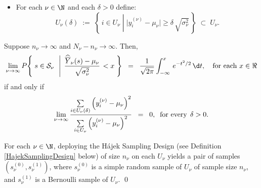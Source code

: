 \begin{theorem}
\begin{itemize}
\begin{equation*}
\end{equation*}
\item For each $\nu \in \N$ and each $\delta > 0$ define:
\begin{equation*}
U_{\nu}(\delta) \;:=\; \left\{\,i \in U_{\nu}\;\left\vert\; \vert y^{(\nu)}_{i} - \mu_{\nu} \vert \geq \delta \, \sqrt{\sigma_{\nu}^{2}} \right.\,\right\}
\; \subset \; U_{\nu}.
\end{equation*}
\end{itemize}
Suppose $n_{\nu} \longrightarrow \infty$ and $N_{\nu} - n_{\nu} \longrightarrow \infty$.
Then,
\begin{equation*}
\lim_{\nu \rightarrow \infty}
P\!\left\{\;s \in \mathcal{S}_{\nu} \;\,\left\vert\;\,\dfrac{\widehat{\overline{Y}}_{\nu}(s) - \mu_{\nu}}{\sqrt{\sigma_{\nu}^{2}}}\right. < x \;\right\}
\;\;=\;\;
\dfrac{1}{\sqrt{2\pi}}
\int_{-\infty}^{x}\,e^{-t^{2}/2}\,\d t,
\quad
\textnormal{for each $x \in \Re$}
\end{equation*}
if and only if
\begin{equation*}
\lim_{\nu\rightarrow\infty}
\dfrac{
\underset{i \in U_{\nu}(\delta)}{\sum}\left(y^{(\nu)}_{i} - \mu_{\nu}\right)^{2}
}{
\underset{i \in U_{\nu}}{\sum}\left(y^{(\nu)}_{i} - \mu_{\nu}\right)^{2}
}\;\; = \;\; 0,
\;\;\textnormal{for every}\;\, \delta > 0.
\end{equation*}
\end{theorem}

\proofoutline
For each $\nu\in\N$, deploying the H\'ajek Sampling Design (see Definition \ref{HajekSamplingDesign} below)
of size $n_{\nu}$ on each $U_{\nu}$ yields a pair of samples $\left(s^{(0)}_{\nu},s^{(1)}_{\nu}\right)$, where $s^{(0)}_{\nu}$
is a simple random sample of $U_{\nu}$ of sample size $n_{\nu}$, and $s^{(1)}_{\nu}$ is a Bernoulli sample of $U_{\nu}$. 
\qed

